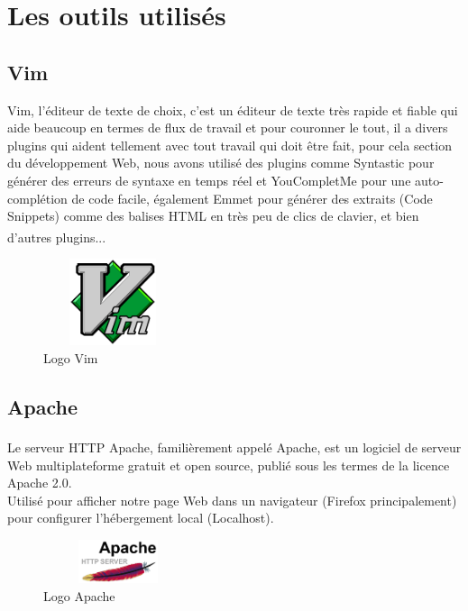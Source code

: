 \documentclass[12pt]{report}
\begin{document}
\vspace*{-0.3in}

\section{Les outils utilisés}

\subsection{Vim}

Vim, l'éditeur de texte de choix, c'est un éditeur de texte très rapide et fiable qui aide beaucoup en termes de flux de travail et pour couronner le tout, il a divers plugins qui aident tellement avec tout travail qui doit être fait, pour cela section du développement Web, nous avons utilisé des plugins comme Syntastic pour générer des erreurs de syntaxe en temps réel et YouCompletMe pour une auto-complétion de code facile, également Emmet pour générer des extraits (Code Snippets) comme des balises HTML en très peu de clics de clavier, et bien d'autres plugins...\textsuperscript{\cite{vim}\cite{schulz2007hacking}}

\begin{figure}[h]
\centering
    \includegraphics[width = 1.6in, height = 1in]{../Images/Vim.png}
\vspace{0.0in}
\caption{Logo Vim}
\end{figure}

\vspace{-0.42in}

\subsection{Apache}

Le serveur HTTP Apache\textsuperscript{\cite{hadoop}}, familièrement appelé Apache, est un logiciel de serveur Web multiplateforme gratuit et open source, publié sous les termes de la licence Apache 2.0.
\\
Utilisé pour afficher notre page Web dans un navigateur (Firefox principalement) pour configurer l'hébergement local (Localhost).

\begin{figure}[h]
\centering
    \includegraphics[width = 1.73in, height = 0.5in]{../Images/Apache.png}
\caption{Logo Apache}
\vspace{-0.3in}
\end{figure}
\end{document}
